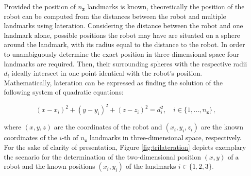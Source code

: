 Provided the position of $n_{\bm{z}}$ landmarks is known, theoretically the position of the robot can be computed from the distances between the robot and multiple landmarks using lateration. Considering the distance between the robot and one landmark alone, possible positions the robot may have are situated on a sphere around the landmark, with its radius equal to the distance to the robot. In order to unambiguously determine the exact position in three-dimensional space four landmarks are required. Then, their surrounding spheres with the respective radii $d_i$ ideally intersect in one point identical with the robot's position. Mathematically, lateration can be expressed as finding the solution of the following system of quadratic equations:


\begin{equation}\label{eq:lateration}
  (x - x_i)^2 + (y-y_i)^2 + (z - z_i)^2 = d_i^2, \quad i \in \{1, \dots, n_{\bm{z}}\}\,,
\end{equation}

\noindent
where $(x, y, z)$ are the coordinates of the robot and $(x_i, y_i, z_i)$ are the known coordinates of the $i$-th of $n_{\bm{z}}$ landmarks in three-dimensional space, respectively. For the sake of clarity of presentation, Figure \ref{fig:trilateration} depicts exemplary the scenario for the determination of the two-dimensional position $(x, y)$ of a robot and the known positions $(x_i, y_i)$ of the landmarks $i \in \{1, 2, 3\}$.

